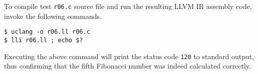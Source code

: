



To compile test \texttt{r06.c} source file and run the resulting LLVM IR assembly code, invoke the following commands.

\begin{verbatim}
$ uclang -o r06.ll r06.c
$ lli r06.ll ; echo $?
\end{verbatim}

Executing the above command will print the status code \texttt{120} to standard output, thus confirming that the fifth Fibonacci number was indeed calculated correctly.


%


%
%
